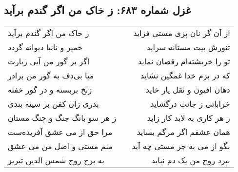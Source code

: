 \begin{center}
\section*{غزل شماره ۶۸۳: ز خاک من اگر گندم برآید}
\label{sec:0683}
\begin{longtable}{l p{0.5cm} r}
ز خاک من اگر گندم برآید
&&
از آن گر نان پزی مستی فزاید
\\
خمیر و نانبا دیوانه گردد
&&
تنورش بیت مستانه سراید
\\
اگر بر گور من آیی زیارت
&&
تو را خرپشته‌ام رقصان نماید
\\
میا بی‌دف به گور من برادر
&&
که در بزم خدا غمگین نشاید
\\
زنخ بربسته و در گور خفته
&&
دهان افیون و نقل یار خاید
\\
بدری زان کفن بر سینه بندی
&&
خراباتی ز جانت درگشاید
\\
ز هر سو بانگ جنگ و چنگ مستان
&&
ز هر کاری به لابد کار زاید
\\
مرا حق از می عشق آفریده‌ست
&&
همان عشقم اگر مرگم بساید
\\
منم مستی و اصل من می عشق
&&
بگو از می به جز مستی چه آید
\\
به برج روح شمس الدین تبریز
&&
بپرد روح من یک دم نپاید
\\
\end{longtable}
\end{center}

